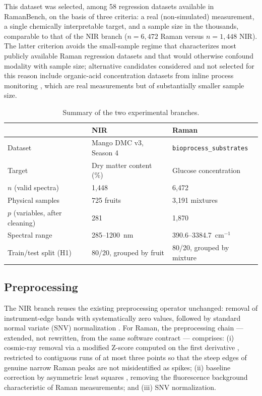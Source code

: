 \documentclass[preprint,12pt]{elsarticle}
\begin{document}
This dataset was selected, among 58 regression datasets available in RamanBench, on the basis of three criteria: a real (non-simulated) measurement, a single chemically interpretable target, and a sample size in the thousands, comparable to that of the NIR branch ($n=6{,}472$ Raman versus $n=1{,}448$ NIR). The latter criterion avoids the small-sample regime that characterizes most publicly available Raman regression datasets and that would otherwise confound modality with sample size; alternative candidates considered and not selected for this reason include organic-acid concentration datasets from inline process monitoring \cite{echtermeyer2021}, which are real measurements but of substantially smaller sample size.

\begin{table}[htbp]
\centering
\caption{Summary of the two experimental branches.}
\label{tab:datasets}
\begin{tabular}{lll}
\toprule
& NIR & Raman \\
\midrule
Dataset & Mango DMC v3, Season 4 & \texttt{bioprocess\_substrates} \\
Target & Dry matter content (\%) & Glucose concentration \\
$n$ (valid spectra) & 1,448 & 6,472 \\
Physical samples & 725 fruits & 3,191 mixtures \\
$p$ (variables, after cleaning) & 281 & 1,870 \\
Spectral range & 285--1200~nm & 390.6--3384.7~cm$^{-1}$ \\
Train/test split (H1) & 80/20, grouped by fruit & 80/20, grouped by mixture \\
\bottomrule
\end{tabular}
\end{table}

\subsection{Preprocessing}

The NIR branch reuses the existing preprocessing operator unchanged: removal of instrument-edge bands with systematically zero values, followed by standard normal variate (SNV) normalization \cite{barnes1989snv}. For Raman, the preprocessing chain --- extended, not rewritten, from the same software contract --- comprises: (i) cosmic-ray removal via a modified Z-score computed on the first derivative \cite{whitaker2018}, restricted to contiguous runs of at most three points so that the steep edges of genuine narrow Raman peaks are not misidentified as spikes; (ii) baseline correction by asymmetric least squares \cite{eilers2005}, removing the fluorescence background characteristic of Raman measurements; and (iii) SNV normalization.
\end{document}
